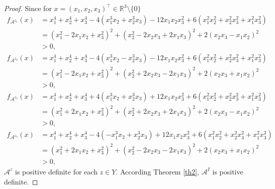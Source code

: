 \documentclass[10pt,a4paper]{amsart}
\begin{document}
\begin{proof}
Since for $x=(x_1,x_2,x_3)^{\top}\in\mathbb{R}^3\setminus\{0\}$
\begin{align*}
  f_{\mathcal{A}^{z_1}}(x) &=x_1^4+x_2^4+x_3^4-4(x_1^3x_2+x_2^3x_3)-12x_1x_2x_3^2+6(x_1^2x_2^2+x_2^2x_3^2+x_1^2x_3^2)\\
  &=(x_1^2-2x_1x_2+x_3^2)^2+(x_2^2-2x_2x_3+2x_1x_3)^2+2(x_2x_3-x_1x_2)^2\\
  &>0,
\end{align*}
\begin{align*}
  f_{\mathcal{A}^{z_2}}(x) &=x_1^4+x_2^4+x_3^4-4(x_1^3x_2-x_2^3x_3)-12x_1x_2x_3^2+6(x_1^2x_2^2+x_2^2x_3^2+x_1^2x_3^2)\\
  &=(x_1^2-2x_1x_2+x_3^2)^2+(x_2^2+2x_2x_3-2x_1x_3)^2+2(x_2x_3+x_1x_2)^2\\
  &>0,
\end{align*}
\begin{align*}
  f_{\mathcal{A}^{z_3}}(x) &=x_1^4+x_2^4+x_3^4+4(x_1^3x_2+x_2^3x_3)+12x_1x_2x_3^2+6(x_1^2x_2^2+x_2^2x_3^2+x_1^2x_3^2)\\
  &=(x_1^2+2x_1x_2+x_3^2)^2+(x_2^2+2x_2x_3+2x_1x_3)^2+2(x_2x_3-x_1x_2)^2\\
  &>0,
\end{align*}
\begin{align*}
 f_{\mathcal{A}^{z_4}}(x) &=x_1^4+x_2^4+x_3^4-4(-x_1^3x_2+x_2^3x_3)+12x_1x_2x_3^2+6(x_1^2x_2^2+x_2^2x_3^2+x_1^2x_3^2)\\
  &=(x_1^2+2x_1x_2+x_3^2)^2+(x_2^2-2x_2x_3-2x_1x_3)^2+2(x_2x_3+x_1x_2)^2\\
  &>0,
\end{align*}
$\mathcal{A}^z$ is positive definite for each $z\in Y$. According Theorem \ref{th2}, $\mathcal{A}^I$ is positive definite.

\end{proof}
\end{document}
